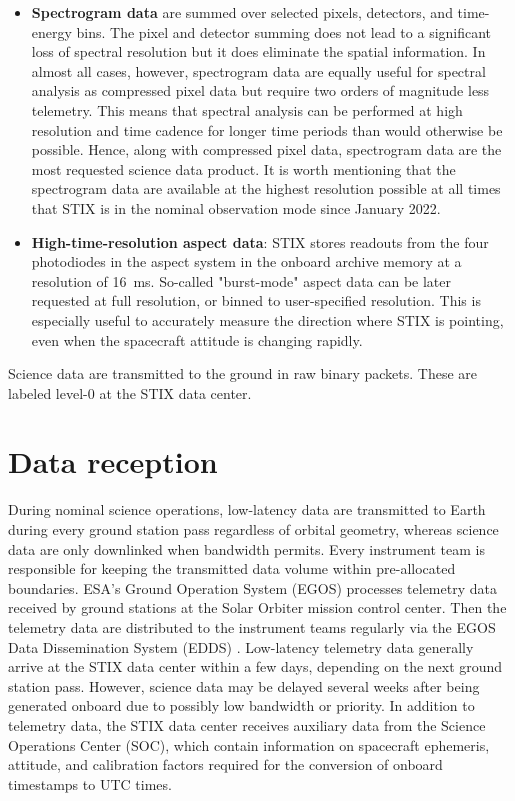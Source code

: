 \documentclass[referee]{preaa} %
\begin{document}
\begin{itemize}
\item {\bf Spectrogram data} are summed over selected pixels, detectors, and time-energy bins. The pixel and detector summing does not lead to a significant loss of spectral resolution but it does eliminate the spatial information.  In almost all cases, however, spectrogram data are equally useful for spectral analysis as compressed pixel data but require two orders of magnitude less telemetry.  This means that spectral analysis can be performed at high resolution and time cadence for longer time periods than would otherwise be possible.  Hence, along with compressed pixel data, spectrogram data are the most requested science data product. It is worth mentioning that the spectrogram data are available at the highest resolution possible at all times that STIX is in the nominal observation mode since January 2022. 

\item {\bf High-time-resolution aspect data}: STIX stores readouts from the four photodiodes in the aspect system in the onboard archive memory at a resolution of 16~ms. So-called "burst-mode" aspect data can be later requested at full resolution, or binned to user-specified resolution. This is especially useful to accurately measure the direction where STIX is pointing, even when the spacecraft attitude is changing rapidly.
\end{itemize}
Science data are transmitted to the ground in raw binary packets.  
These are labeled level-0 at the STIX data center.  

\section{Data reception}
During nominal science operations, low-latency data are transmitted to Earth during every ground station pass regardless of orbital geometry, whereas science data are only downlinked when bandwidth permits. Every instrument team is responsible for keeping the transmitted data volume within pre-allocated boundaries. ESA's Ground Operation System (EGOS) processes telemetry data received by ground stations at the Solar Orbiter mission control center. 
Then the telemetry data are distributed to the instrument teams regularly via the EGOS Data Dissemination System (EDDS) \citep{EDDS}. 
Low-latency telemetry data generally arrive at the STIX data center within a few days, depending on the next ground station pass. However, science data may be delayed 
several weeks after being generated onboard due to possibly low bandwidth or priority.
In addition to telemetry data, the STIX data center receives auxiliary data \citep{spice1996,spice2018} from the Science Operations Center (SOC), which contain information on spacecraft ephemeris, attitude, and calibration factors required for the conversion of onboard timestamps to UTC times. 
\end{document}
